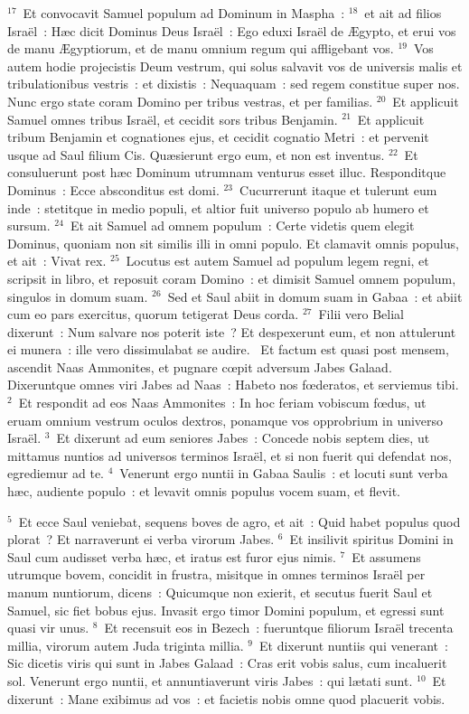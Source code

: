 ${}^{17}$~Et convocavit Samuel populum ad Dominum in Maspha~:
${}^{18}$~et ait ad filios Isra\"el~: H\ae c dicit Dominus Deus Isra\"el~: Ego eduxi Isra\"el de \AE gypto, et erui vos de manu \AE gyptiorum, et de manu omnium regum qui affligebant vos.
${}^{19}$~Vos autem hodie projecistis Deum vestrum, qui solus salvavit vos de universis malis et tribulationibus vestris~: et dixistis~: Nequaquam~: sed regem constitue super nos. Nunc ergo state coram Domino per tribus vestras, et per familias.
${}^{20}$~Et applicuit Samuel omnes tribus Isra\"el, et cecidit sors tribus Benjamin.
${}^{21}$~Et applicuit tribum Benjamin et cognationes ejus, et cecidit cognatio Metri~: et pervenit usque ad Saul filium Cis. Qu\ae sierunt ergo eum, et non est inventus.
${}^{22}$~Et consuluerunt post h\ae c Dominum utrumnam venturus esset illuc. Responditque Dominus~: Ecce absconditus est domi.
${}^{23}$~Cucurrerunt itaque et tulerunt eum inde~: stetitque in medio populi, et altior fuit universo populo ab humero et sursum.
${}^{24}$~Et ait Samuel ad omnem populum~: Certe videtis quem elegit Dominus, quoniam non sit similis illi in omni populo. Et clamavit omnis populus, et ait~: Vivat rex.
${}^{25}$~Locutus est autem Samuel ad populum legem regni, et scripsit in libro, et reposuit coram Domino~: et dimisit Samuel omnem populum, singulos in domum suam.
${}^{26}$~Sed et Saul abiit in domum suam in Gabaa~: et abiit cum eo pars exercitus, quorum tetigerat Deus corda.
${}^{27}$~Filii vero Belial dixerunt~: Num salvare nos poterit iste~? Et despexerunt eum, et non attulerunt ei munera~: ille vero dissimulabat se audire.
~\lettrine[lines=10,image=true,loversize=0.05,lraise=-0.03]{E}{}t factum est quasi post mensem, ascendit Naas Ammonites, et pugnare cœpit adversum Jabes Galaad. Dixeruntque omnes viri Jabes ad Naas~: Habeto nos fœderatos, et serviemus tibi.
${}^{2}$~Et respondit ad eos Naas Ammonites~: In hoc feriam vobiscum fœdus, ut eruam omnium vestrum oculos dextros, ponamque vos opprobrium in universo Isra\"el.
${}^{3}$~Et dixerunt ad eum seniores Jabes~: Concede nobis septem dies, ut mittamus nuntios ad universos terminos Isra\"el, et si non fuerit qui defendat nos, egrediemur ad te.
${}^{4}$~Venerunt ergo nuntii in Gabaa Saulis~: et locuti sunt verba h\ae c, audiente populo~: et levavit omnis populus vocem suam, et flevit.


${}^{5}$~Et ecce Saul veniebat, sequens boves de agro, et ait~: Quid habet populus quod plorat~? Et narraverunt ei verba virorum Jabes.
${}^{6}$~Et insilivit spiritus Domini in Saul cum audisset verba h\ae c, et iratus est furor ejus nimis.
${}^{7}$~Et assumens utrumque bovem, concidit in frustra, misitque in omnes terminos Isra\"el per manum nuntiorum, dicens~: Quicumque non exierit, et secutus fuerit Saul et Samuel, sic fiet bobus ejus. Invasit ergo timor Domini populum, et egressi sunt quasi vir unus.
${}^{8}$~Et recensuit eos in Bezech~: fueruntque filiorum Isra\"el trecenta millia, virorum autem Juda triginta millia.
${}^{9}$~Et dixerunt nuntiis qui venerant~: Sic dicetis viris qui sunt in Jabes Galaad~: Cras erit vobis salus, cum incaluerit sol. Venerunt ergo nuntii, et annuntiaverunt viris Jabes~: qui l\ae tati sunt.
${}^{10}$~Et dixerunt~: Mane exibimus ad vos~: et facietis nobis omne quod placuerit vobis.


